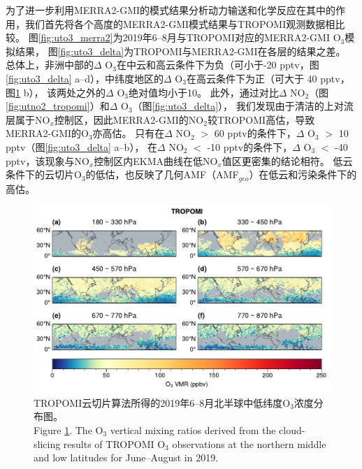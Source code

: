 为了进一步利用MERRA2-GMI的模式结果分析动力输送和化学反应在其中的作用，我们首先将各个高度的MERRA2-GMI模式结果与TROPOMI观测数据相比较。
图\ref{fig:uto3_merra2}为2019年6--8月与TROPOMI对应的MERRA2-GMI O$_3$模拟结果，
图\ref{fig:uto3_delta}为TROPOMI与MERRA2-GMI在各层的结果之差。
总体上，非洲中部的$\Delta$ O$_3$在中云和高云条件下为负（可小于-20 pptv，图\ref{fig:uto3_delta} a--d），中纬度地区的$\Delta$ O$_3$在高云条件下为正（可大于 40 pptv，图\ref{fig:uto3_tropomi} b），
该两处之外的$\Delta$ O$_3$绝对值均小于10。
此外，通过对比$\Delta$ NO$_2$（图\ref{fig:utno2_tropomi}）和$\Delta$ O$_3$（图\ref{fig:uto3_delta}），
我们发现由于清洁的上对流层属于NO$_x$控制区\citep{Brown.2022}，因此MERRA2-GMI的NO$_2$较TROPOMI高估，导致MERRA2-GMI的O$_3$亦高估。
只有在$\Delta$ NO$_2$ $>$ 60 pptv的条件下，$\Delta$ O$_3$ $>$ 10 pptv（图\ref{fig:uto3_delta} a--b），
在$\Delta$ NO$_2$ $<$ -10 pptv的条件下，$\Delta$ O$_3$ $<$ -40 pptv，该现象与NO$_x$控制区内EKMA曲线在低NO$_x$值区更密集的结论相符。
低云条件下的云切片O$_3$的低估，也反映了几何AMF（AMF$_{geo}$）在低云和污染条件下的高估\citep{BelmonteRivas.2015}。

\begin{figure}[!htbp]
    \centering
    \includegraphics[width=15cm]{./figures/uto3_tropomi.pdf}
    \caption{
    TROPOMI云切片算法所得的2019年6--8月北半球中低纬度O$_3$浓度分布图。 \\
    Figure \ref{fig:uto3_tropomi}. The O$_3$ vertical mixing ratios derived from the cloud-slicing results of TROPOMI O$_3$ observations at the northern middle and low latitudes for June--August in 2019.
    }
    \label{fig:uto3_tropomi}
\end{figure}


